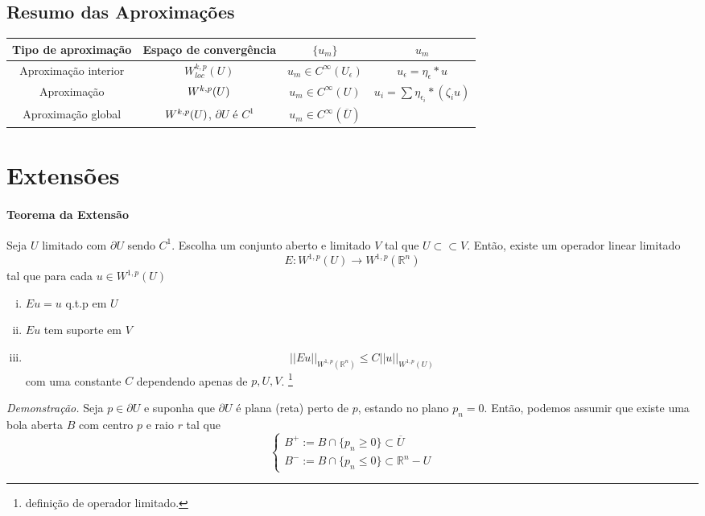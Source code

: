 \documentclass[a4paper, 11pt]{article}
\newcommand{\Rn}{{\mathbb{R}^n}}
\newcommand{\pu}{\partial U}
\newcommand{\e}{\epsilon}
\begin{document}
\subsection*{Resumo das Aproximações}

\begin{tabular}{cccc}
	\hline
	Tipo de aproximação & Espaço de convergência & \( \{u_m\} \)  & \( u_m \) \\
	\hline
	Aproximação interior	& \( W^{k,p}_{loc}(U) \) 	& \( u_m \in C^\infty(U_\e) \) & \( u_\e = \eta_\e * u \)\\
	
	Aproximação    			& \( W^{k,p}(U) \) 		& \( u_m \in C^\infty(U)  \) & \( u_i = \sum \eta_{\e_i} * (\zeta_i u) \) \\
	
	Aproximação global	 	& \( W^{k,p}(U)\), $ \pu $ é $ C^1 $		& \( u_m \in C^\infty(\overline{U}) \) &  \\
	\hline
\end{tabular}





\section{Extensões}

\paragraph{Teorema da Extensão}\label{t:sobolev-extensao} Seja \( U \) limitado com \( \pu \) sendo \( C^1 \).  Escolha um conjunto aberto e limitado \( V \) tal que \( U \subset\subset V \). Então, existe um operador linear limitado \[ E:W^{1,p}(U) \rightarrow W^{1,p}(\Rn) \] tal que para cada \( u \in W^{1,p}(U) \) \begin{enumerate}[(i)]
	\item \( Eu=u \) q.t.p em \( U \)
	\item \( Eu \) tem suporte em \( V \)
	\item \[ ||Eu||_{W^{1,p}(\Rn)} \leq C ||u||_{W^{1,p}(U)} \] com uma constante \( C \) dependendo apenas de \( p, U, V \). \footnote{definição de operador limitado.}
\end{enumerate}

\textit{Demonstração.} Seja \( p \in \pu \) e suponha que \( \pu \) é plana (reta) perto de \( p \), estando no plano \( p_n=0 \). Então, podemos assumir que existe uma bola aberta \( B \) com centro \( p \) e raio \( r \) tal que \[ \begin{cases}
	B^+ := B \cap \{ p_n \geq 0 \}  \subset \overline{U}\\
	B^- := B \cap \{ p_n \leq 0 \} \subset \Rn - U 
\end{cases} \]
\end{document}
